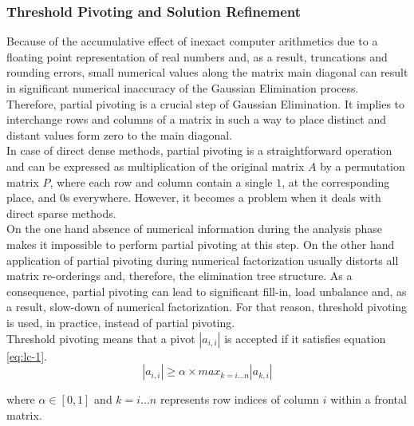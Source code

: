 \subsubsection{Threshold Pivoting and Solution Refinement}
\label{subseq:pivot-hadling}


Because of the accumulative effect of inexact computer arithmetics due to a floating point representation of real numbers and, as a result, truncations and rounding errors, small numerical values along the matrix main diagonal can result in significant numerical inaccuracy of the Gaussian Elimination process. Therefore, partial pivoting is a crucial step of Gaussian Elimination. It implies to interchange rows and columns of a matrix in such a way to place distinct and distant values form zero to the main diagonal.\\


In case of direct dense methods, partial pivoting is a straightforward operation and can be expressed as multiplication of the original matrix $A$ by a permutation matrix $P$, where each row and column contain a single $1$, at the corresponding place, and $0$s everywhere. However, it becomes a problem when it deals with direct sparse methods.\\


On the one hand absence of numerical information during the analysis phase makes it impossible to perform partial pivoting at this step. On the other hand application of partial pivoting during numerical factorization usually distorts all matrix re-orderings and, therefore, the elimination tree structure. As a consequence, partial pivoting can lead to significant fill-in, load unbalance and, as a result, slow-down of numerical factorization. For that reason, threshold pivoting is used, in practice, instead of partial pivoting.\\


Threshold pivoting means that a pivot $|a_{i,i}|$ is accepted if it satisfies equation \ref{eq:lc-1}.\\
\begin{equation}\label{eq:lc-1}
|a_{i,i}| \geq \alpha \times max_{k=i \dots n} |a_{k,i}|
\end{equation}

where $\alpha \in [0,1]$ and $k=i \dots n$ represents row indices of column $i$ within a frontal matrix.\\

